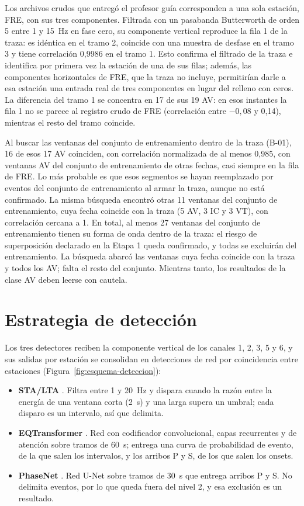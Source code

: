 \documentclass[12pt,oneside,spanish,oldfontcommands]{memoir}
\begin{document}
Los archivos crudos que entregó el profesor guía corresponden a una sola
estación, FRE, con sus tres componentes. Filtrada con un pasabanda Butterworth
de orden 5 entre 1 y 15~Hz en fase cero, su componente vertical reproduce la
fila 1 de la traza: es idéntica en el tramo 2, coincide con una muestra de
desfase en el tramo 3 y tiene correlación 0,9986 en el tramo 1. Esto confirma
el filtrado de la traza e identifica por primera vez la estación de una de
sus filas; además, las componentes horizontales de FRE, que la traza no
incluye, permitirían darle a esa estación una entrada real de tres
componentes en lugar del relleno con ceros. La diferencia del tramo 1 se
concentra en 17 de sus 19 AV: en esos instantes la fila 1 no se parece al
registro crudo de FRE (correlación entre $-0{,}08$ y 0,14), mientras el resto
del tramo coincide.

Al buscar las ventanas del conjunto de entrenamiento dentro de la traza
(B-01), 16 de esos 17 AV coinciden, con correlación normalizada de al menos
0,985, con ventanas AV del conjunto de entrenamiento de otras fechas, casi
siempre en la fila de FRE. Lo más probable es que esos segmentos se hayan
reemplazado por eventos del conjunto de entrenamiento al armar la traza,
aunque no está confirmado. La misma búsqueda encontró otras 11 ventanas del
conjunto de entrenamiento, cuya fecha coincide con la traza (5 AV, 3 IC y 3
VT), con correlación cercana a 1. En total, al menos 27 ventanas del conjunto
de entrenamiento tienen su forma de onda dentro de la traza: el riesgo de
superposición declarado en la Etapa 1 queda confirmado, y todas se excluirán
del entrenamiento. La búsqueda
abarcó las ventanas cuya fecha coincide con la traza y todos los AV; falta el
resto del conjunto. Mientras tanto, los resultados de la clase AV deben
leerse con cautela.

\section{Estrategia de detección}
\label{sec:det-estrategia}

Los tres detectores reciben la componente vertical de los canales 1, 2, 3, 5
y 6, y sus salidas por estación se consolidan en detecciones de red por
coincidencia entre estaciones (Figura~\ref{fig:esquema-deteccion}):

\begin{itemize}
\item \textbf{STA/LTA} \parencite{allen1978stalta}. Filtra entre 1 y 20~Hz y
dispara cuando la razón entre la energía de una ventana corta (2~s) y una
larga supera un umbral; cada disparo es un intervalo, así que delimita.
\item \textbf{EQTransformer} \parencite{mousavi2020eqtransformer}. Red con
codificador convolucional, capas recurrentes y de atención sobre tramos de
60~s; entrega una curva de probabilidad de evento, de la que salen los
intervalos, y los arribos P y S, de los que salen los onsets.
\item \textbf{PhaseNet} \parencite{zhu2019phasenet}. Red U-Net sobre tramos de
30~s que entrega arribos P y S. No delimita eventos, por lo que queda fuera
del nivel 2, y esa exclusión es un resultado.
\end{itemize}
\end{document}

